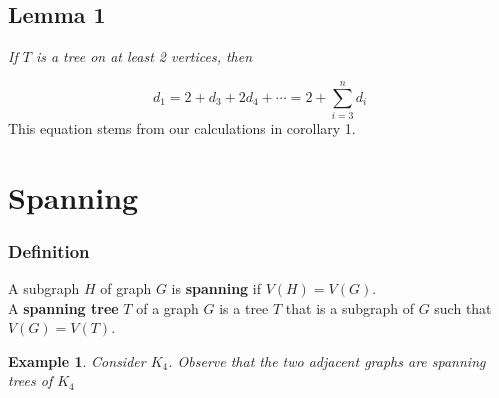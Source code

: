 \documentclass{report}
\newtheorem{ex}{Example}[section]
\begin{document}
\subsection{Lemma 1}
\begin{center}
\textit{If $T$ is a tree on at least 2 vertices, then}
\end{center}
$$d_1 = 2 + d_3 + 2d_4 + \cdots = 2 + \sum_{i=3}^n d_i$$
This equation stems from our calculations in corollary 1.
\section{Spanning}
\subsubsection{Definition}
A subgraph $H$ of graph $G$ is \textbf{spanning} if $V(H) = V(G)$.\\
A \textbf{spanning tree} $T$ of a graph $G$ is a tree $T$ that is a subgraph of $G$ such that $V(G) = V(T)$. 
\begin{ex}
Consider $K_4$. Observe that the two adjacent graphs are spanning trees of $K_4$
\end{ex}
\end{document}
